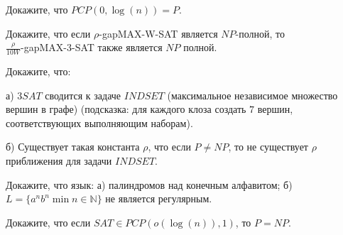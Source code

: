 \setcounter{curtask}{35}


\begin{task}
    Докажите, что $PCP(0, \log(n)) = P$.
\end{task}

\begin{task}
    Докажите, что если $\rho${-gap}{MAX-W-SAT} является $NP$-полной, то \\
    $\frac{\rho}{10W}${-gap}{MAX-3-SAT} также является $NP$ полной.
\end{task}

\begin{task}
    Докажите, что:

    а) $3SAT$ сводится к задаче $INDSET$ (максимальное независимое множество вершин в
    графе) (подсказка: для каждого клоза создать $7$ вершин, соответствующих
    выполняющим наборам).

    б) Существует такая константа $\rho$, что если $P \neq NP$, то не существует
    $\rho$ приближения для задачи $INDSET$.
\end{task}

\begin{task}
    Докажите, что язык:
    а) палиндромов над конечным алфавитом;
    б) $L = \{a^nb^n \min n \in \mathbb{N}\}$ не является регулярным.
\end{task}

\begin{task}
    Докажите, что если $SAT \in PCP(o(\log(n)), 1)$, то $P = NP$.
\end{task}